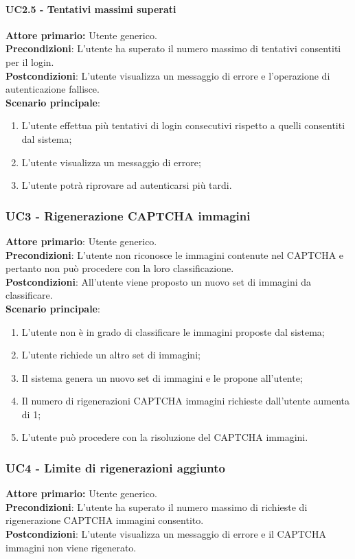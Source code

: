 \paragraph{UC2.5 - Tentativi massimi superati}
\textbf{Attore primario:} Utente generico.\\
\textbf{Precondizioni}: L'utente ha superato il numero massimo di tentativi consentiti per il login.\\
\textbf{Postcondizioni}: L’utente visualizza un messaggio di errore e l’operazione di autenticazione fallisce.\\

\textbf{Scenario principale}:
\begin{enumerate}
    \item L'utente effettua più tentativi di login consecutivi rispetto a quelli consentiti dal sistema;
	\item L’utente visualizza un messaggio di errore;
	\item L'utente potrà  riprovare ad autenticarsi più tardi.
\end{enumerate}

\subsubsection{UC3 - Rigenerazione CAPTCHA immagini}
\textbf{Attore primario}: Utente generico.\\
\textbf{Precondizioni}: L'utente non riconosce le immagini contenute nel CAPTCHA e pertanto non può procedere con la loro classificazione.\\
\textbf{Postcondizioni}: All'utente viene proposto un nuovo set di immagini da classificare.\\

\textbf{Scenario principale}:
\begin{enumerate}
   \item L'utente non è in grado di classificare le immagini proposte dal sistema;
   \item L'utente richiede un altro set di immagini;
   \item Il sistema genera un nuovo set di immagini e le propone all'utente;
   \item Il numero di rigenerazioni CAPTCHA immagini richieste dall’utente aumenta di 1;
   \item L'utente può procedere con la risoluzione del CAPTCHA immagini.
\end{enumerate}

\subsubsection{UC4 - Limite di rigenerazioni aggiunto}
\textbf{Attore primario:} Utente generico.\\
\textbf{Precondizioni}: L'utente ha superato il numero massimo di richieste di rigenerazione CAPTCHA immagini consentito.\\
\textbf{Postcondizioni}: L’utente visualizza un messaggio di errore e il CAPTCHA immagini non viene rigenerato.\\

